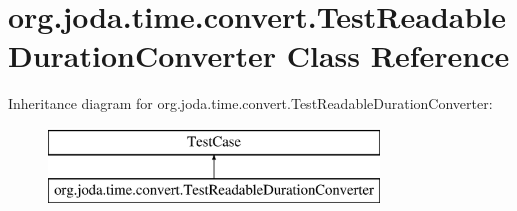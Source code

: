 \hypertarget{classorg_1_1joda_1_1time_1_1convert_1_1_test_readable_duration_converter}{\section{org.\-joda.\-time.\-convert.\-Test\-Readable\-Duration\-Converter Class Reference}
\label{classorg_1_1joda_1_1time_1_1convert_1_1_test_readable_duration_converter}
}
Inheritance diagram for org.\-joda.\-time.\-convert.\-Test\-Readable\-Duration\-Converter\-:\begin{figure}[H]
\begin{center}
\leavevmode
\includegraphics[height=2.000000cm]{classorg_1_1joda_1_1time_1_1convert_1_1_test_readable_duration_converter}
\end{center}
\end{figure}

